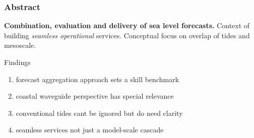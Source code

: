 \begin{frame}
\frametitle{Abstract}

\begin{center}
\textbf{Combination, evaluation and delivery of sea level forecasts.}
\vfill{}
Context of building \emph{seamless operational} services.
\vfill{}
Conceptual focus on overlap of tides and mesoscale.
\end{center}

\vfill{}
Findings
\begin{enumerate}[I]
    \item forecast aggregation approach sets a skill benchmark
    \item coastal waveguide perspective has special relevance
    \item conventional tides cant be ignored but do need clarity
    \item seamless services not just a model-scale cascade
\end{enumerate}

\end{frame}
